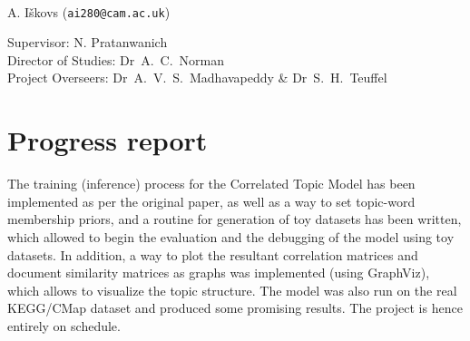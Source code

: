 \documentclass[12pt,a4]{article}
\begin{document}
\begin{center}

\textbf{}\\
A. I\v{s}kovs (\texttt{ai280@cam.ac.uk})\\
\vspace{0.3in}

Supervisor: N. Pratanwanich\\
Director of Studies: Dr~A.~C.~Norman\\
Project Overseers: Dr~A.~V.~S.~Madhavapeddy  \& Dr~S.~H.~Teuffel\\

\end{center}


\section*{Progress report}

The training (inference) process for the Correlated Topic Model has been implemented as per the original paper, as well as a way to set topic-word membership priors, and a routine for generation of toy datasets has been written, which allowed to begin the evaluation and the debugging of the model using toy datasets. In addition, a way to plot the resultant correlation matrices and document similarity matrices as graphs was implemented (using GraphViz), which allows to visualize the topic structure. The model was also run on the real KEGG/CMap dataset and produced some promising results. The project is hence entirely on schedule.
\end{document}
